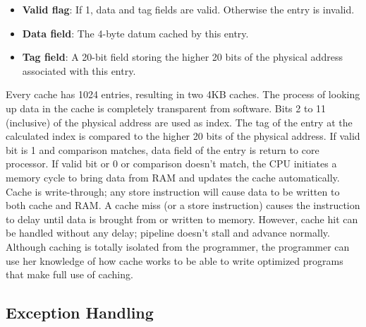 \documentclass[]{scrartcl}
\begin{document}
\begin{itemize}

\item \textbf{Valid flag}: If 1, data and tag fields are valid. Otherwise
      the entry is invalid.

\item \textbf{Data field}: The 4-byte datum cached by this entry.

\item \textbf{Tag field}: A 20-bit field storing the higher 20 bits
      of the physical address associated with this entry.

\end{itemize}

Every cache has 1024 entries, resulting in two 4KB caches. The process
of looking up data in the cache is completely transparent from software.
Bits 2 to 11 (inclusive) of the physical address are used as index.
The tag of the entry at the calculated index is compared to the
higher 20 bits of the physical address. If valid bit is 1 and
comparison matches, data field of the entry is return to core processor.
If valid bit or 0 or comparison doesn't match, the CPU initiates
a memory cycle to bring data from RAM and updates the cache automatically.\\

Cache is write-through; any store instruction will cause data to
be written to both cache and RAM. A cache miss (or a store instruction) 
causes the instruction to delay until data is brought from or written to 
memory. However, cache hit can be handled without any delay; pipeline doesn't 
stall and advance normally. Although caching is totally isolated from the 
programmer, the programmer can use her knowledge of how cache works to 
be able to write optimized programs that make full use of caching.\\

\subsection{Exception Handling}
\end{document}
